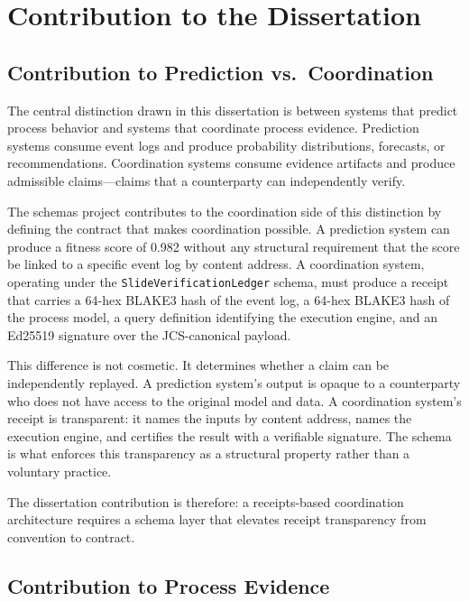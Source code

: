 
\section{Contribution to the Dissertation}
\label{sec:schemas-contribution}

\subsection{Contribution to Prediction vs.~Coordination}
\label{sec:schemas-contribution-prediction}

The central distinction drawn in this dissertation is between systems that predict process behavior
and systems that coordinate process evidence. Prediction systems consume event logs and produce
probability distributions, forecasts, or recommendations. Coordination systems consume evidence
artifacts and produce admissible claims---claims that a counterparty can independently verify.

The schemas project contributes to the coordination side of this distinction by defining the
contract that makes coordination possible. A prediction system can produce a fitness score of 0.982
without any structural requirement that the score be linked to a specific event log by content
address. A coordination system, operating under the \texttt{SlideVerificationLedger} schema,
must produce a receipt that carries a 64-hex BLAKE3 hash of the event log, a 64-hex BLAKE3 hash
of the process model, a query definition identifying the execution engine, and an Ed25519 signature
over the JCS-canonical payload.

This difference is not cosmetic. It determines whether a claim can be independently replayed. A
prediction system's output is opaque to a counterparty who does not have access to the original
model and data. A coordination system's receipt is transparent: it names the inputs by content
address, names the execution engine, and certifies the result with a verifiable signature. The
schema is what enforces this transparency as a structural property rather than a voluntary practice.

The dissertation contribution is therefore: a receipts-based coordination architecture requires
a schema layer that elevates receipt transparency from convention to contract.

\subsection{Contribution to Process Evidence}
\label{sec:schemas-contribution-evidence}

